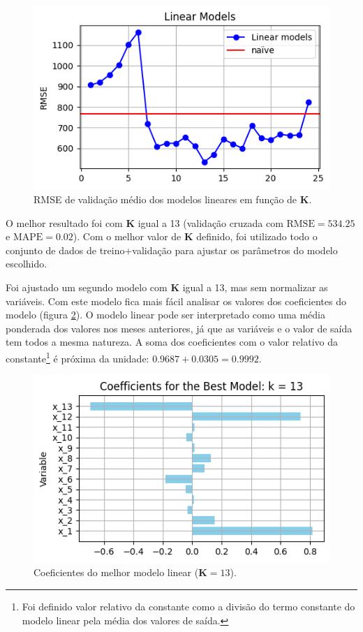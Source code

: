 \documentclass[final,5p]{elsarticle}
\numberwithin{equation}{section}
\begin{document}
    \begin{figure}[hbt!]
        \includegraphics[width=0.95\columnwidth]{B1_LinearModels.png}
        \caption{RMSE de validação médio dos modelos lineares em função de \textbf{K}.}
        \label{fig:modelos_lineares}
    \end{figure}

    O melhor resultado foi com \textbf{K} igual a 13 (validação cruzada com $\text{RMSE} = 534.25$ e $\text{MAPE} = 0.02$). Com o melhor valor de \textbf{K} definido, foi utilizado todo o conjunto de dados de treino+validação para ajustar os parâmetros do modelo escolhido.

    Foi ajustado um segundo modelo com \textbf{K} igual a 13, mas sem normalizar as variáveis. Com este modelo fica mais fácil analisar os valores dos coeficientes do modelo (figura \ref{fig:coef_modelo_linear}). O modelo linear pode ser interpretado como uma média ponderada dos valores nos meses anteriores, já que as variáveis e o valor de saída tem todos a mesma natureza. A soma dos coeficientes com o valor relativo da constante\footnote{Foi definido valor relativo da constante como a divisão do termo constante do modelo linear pela média dos valores de saída.} é próxima da unidade: $0.9687 + 0.0305 = 0.9992$.

    \begin{figure}[hbt!]
        \includegraphics[width=0.95\columnwidth]{B1_CoefficientsNoScaling.png}
        \caption{Coeficientes do melhor modelo linear ($\textbf{K} = 13$).}
        \label{fig:coef_modelo_linear}
    \end{figure}
\end{document}
